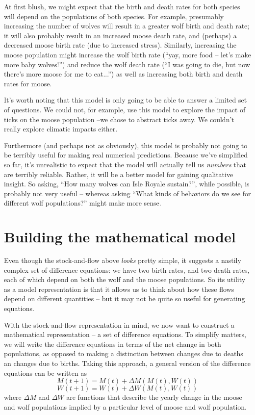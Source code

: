 At first blush, we might expect that the birth and death rates for both species will depend on the populations of both species.  For example, presumably increasing the number of wolves will result in a greater wolf birth and death rate; it will also probably result in an increased moose death rate, and (perhaps) a decreased moose birth rate (due to increased stress).  Similarly, increasing the moose population might increase the wolf birth rate (``yay, more food -- let's make more baby wolves!'') and reduce the wolf death rate (``I was going to die, but now there's more moose for me to eat...'') as well as increasing both birth and death rates for moose.

It's worth noting that this model is only going to be able to answer a limited set of questions.  We could not, for example, use this model to explore the impact of ticks on the moose population --we chose to abstract ticks away.  We couldn't really explore climatic impacts either.  

Furthermore (and perhaps not as obviously), this model is probably not going to be terribly useful for making real numerical predictions.  Because we've simplified so far, it's unrealistic to expect that the model will actually tell us {\it numbers} that are terribly reliable.  Rather, it will be a better model for gaining qualitative insight.  So asking, ``How many wolves can Isle Royale sustain?'', while possible, is probably not very useful -- whereas asking ``What kinds of behaviors do we see for different wolf populations?'' might make more sense.

\section{Building the mathematical model}
Even though the stock-and-flow above {\it looks} pretty simple, it suggests a nastily complex set of difference equations:  we have two birth rates, and two death rates, each of which depend on both the wolf and the moose populations.   So its utility as a model representation is that it allows us to think about how these flows depend on different quantities -- but it may not be quite so useful for generating equations.


With the stock-and-flow representation in mind, we now want to construct a mathematical representation -- a set of difference equations.  To simplify matters, we will write the difference equations in terms of the net change in both populations, as opposed to making a distinction between changes due to deaths an changes due to births.  Taking this approach, a general version of the difference equations can be written as 
$$M(t+1) = M(t) + \Delta M(M(t), W(t))$$
$$W(t+1) = W(t) + \Delta W(M(t), W(t))$$
where $\Delta M$ and $\Delta W$ are functions that describe the yearly change in the moose and wolf populations implied by a particular level of moose and wolf population.

